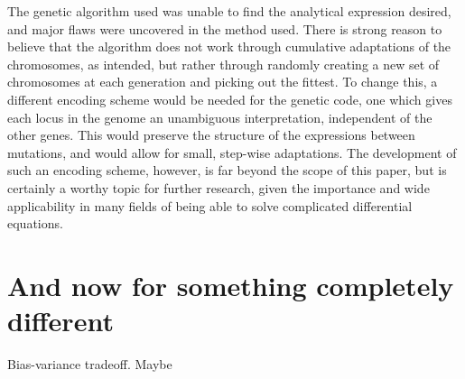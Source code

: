\documentclass[multicolumn, 10pt]{extarticle}
\begin{document}
The genetic algorithm used was unable to find the analytical expression desired, and major flaws were uncovered in the method used. There is strong reason to believe that the algorithm does not work through cumulative adaptations of the chromosomes, as intended, but rather through randomly creating a new set of chromosomes at each generation and picking out the fittest. To change this, a different encoding scheme would be needed for the genetic code, one which gives each locus in the genome an unambiguous interpretation, independent of the other genes. This would preserve the structure of the expressions between mutations, and would allow for small, step-wise adaptations. The development of such an encoding scheme, however, is far beyond the scope of this paper, but is certainly a worthy topic for further research, given the importance and wide applicability in many fields of being able to solve complicated differential equations.

\appendix
\section{And now for something completely different}
Bias-variance tradeoff. Maybe




\end{document}

